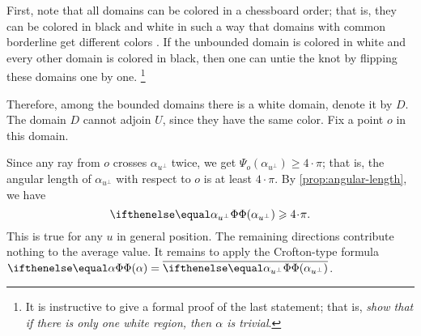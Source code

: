 First, note that all domains can be colored in a chessboard order;
that is, they can be colored in black and white in such a way that domains with common borderline get different colors \cite[Exercise 2.27]{adams}.
If the unbounded domain is colored in white and every other domain is colored in black, then one can untie the knot by flipping these domains one by one.%
\footnote{It is instructive to give a formal proof of the last statement; that is, \textit{show that if there is only one white region, then $\alpha$ is trivial}.}

Therefore, among the bounded domains there is a white domain, denote it by $D$.
The domain $D$ cannot adjoin %
$U$, since they have the same color.
Fix a point $o$ in this domain.

Since any ray from $o$ crosses $\alpha_{u^\perp}$ twice, we get $\Psi_o(\alpha_{u^\perp})\ge 4\cdot\pi$;
that is, the angular length of $\alpha_{u^\perp}$ with respect to $o$ is at least $4\cdot\pi$. 
By \ref{prop:angular-length}, we have 
\[\tc{\alpha_{u^\perp}}\ge4\cdot\pi.\]
This is true for any $u$ in general position.
The remaining directions contribute nothing to the average value.
It remains to apply the Crofton-type formula $\tc{\alpha}=\overline{\tc{\alpha_{u^\perp}}}$.
\qeds
